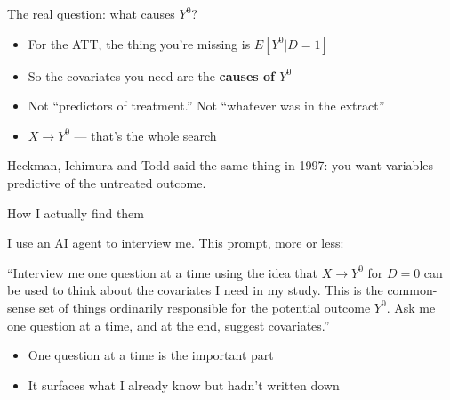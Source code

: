 \documentclass{beamer}
\newcommand{\highlight}[1]{\textcolor{accent}{\textbf{#1}}}
\newcommand{\deemph}[1]{\textcolor{warmgray}{\small #1}}
\begin{document}
\begin{frame}{The real question: what causes $Y^0$?}

\begin{itemize}
\item For the ATT, the thing you're missing is $E[Y^0|D=1]$
\item So the covariates you need are the \highlight{causes of $Y^0$}
\item Not ``predictors of treatment.'' Not ``whatever was in the extract''
\item $X \rightarrow Y^0$ --- that's the whole search
\end{itemize}

\vspace{0.6em}

\deemph{Heckman, Ichimura and Todd said the same thing in 1997: you want variables predictive of the untreated outcome.}

\end{frame}


\begin{frame}{How I actually find them}

I use an AI agent to interview me. This prompt, more or less:

\vspace{0.6em}

\begin{block}{}
\small
``Interview me one question at a time using the idea that $X \rightarrow Y^0$ for
$D=0$ can be used to think about the covariates I need in my study. This is the
common-sense set of things ordinarily responsible for the potential outcome
$Y^0$. Ask me one question at a time, and at the end, suggest covariates.''
\end{block}

\vspace{0.5em}

\begin{itemize}
\item One question at a time is the important part
\item It surfaces what I already know but hadn't written down
\end{itemize}

\end{frame}
\end{document}
